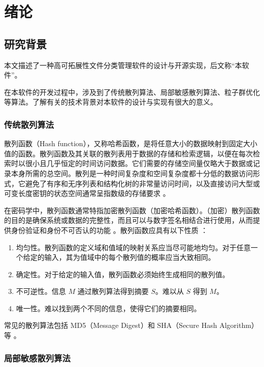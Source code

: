 \chapter{绪论}

\section{研究背景}

本文描述了一种高可拓展性文件分类管理软件的设计与开源实现，后文称“本软件”。

在本软件的开发过程中，涉及到了传统散列算法、局部敏感散列算法、粒子群优化等算法。了解有关的技术背景对本软件的设计与实现有很大的意义。

\subsection{传统散列算法}

散列函数（Hash function），又称哈希函数，是将任意大小的数据映射到固定大小值的函数。散列函数及其关联的散列表用于数据的存储和检索逻辑，以便在每次检索时以很小且几乎恒定的时间访问数据。它们需要的存储空间量仅略大于数据或记录本身所需的总空间。散列是一种时间复杂度和空间复杂度都十分低的数据访问形式，它避免了有序和无序列表和结构化树的非常量访问时间，以及直接访问大型或可变长度密钥的状态空间通常呈指数级的存储要求 \cite{wiki_hash}。

在密码学中，散列函数通常特指加密散列函数（加密哈希函数）。（加密）散列函数的目的是确保系统或数据的完整性，而且可以与数字签名相结合进行使用，从而提供身份验证和身份不可否认的功能 \cite{hash1}。散列函数应具有以下性质 \cite{hash2}：

\begin{enumerate}
    \item 均匀性。散列函数的定义域和值域的映射关系应当尽可能地均匀。对于任意一个给定的输入，其为值域中的每个散列值的概率应当大致相同。
    \item 确定性。对于给定的输入值，散列函数必须始终生成相同的散列值。
    \item 不可逆性。信息 $M$ 通过散列算法得到摘要 $S$。难以从 $S$ 得到 $M$。
    \item 唯一性。难以找到两个不同的信息，使得它们的摘要相同。
\end{enumerate}

常见的散列算法包括 MD5（Message Digest）和 SHA（Secure Hash Algorithm）等 \cite{hash3}。

\subsection{局部敏感散列算法}


